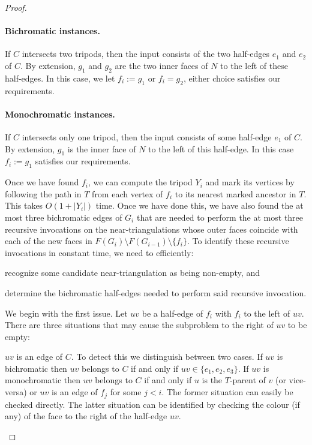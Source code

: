 \documentclass{patmorin}
\begin{document}
\begin{proof}
\paragraph{Bichromatic instances.}
If $C$ intersects two tripods, then the input consists of the two half-edges $e_1$ and $e_2$ of $C$. By extension, $g_1$ and $g_2$ are the two inner faces of $N$ to the left of these half-edges.  In this case, we let $f_i:=g_1$ or $f_i=g_2$, either choice satisfies our requirements.

\paragraph{Monochromatic instances.}
If $C$ intersects only one tripod, then the input consists of some half-edge $e_1$ of $C$. By extension, $g_1$ is the inner face of $N$ to the left of this half-edge.  In this case $f_i:=g_1$ satisfies our requirements.

Once we have found $f_i$, we can compute the tripod $Y_i$ and mark its vertices by following the path in $T$ from each vertex of $f_i$ to its nearest marked ancestor in $T$.  This takes $O(1+|Y_i|)$ time.  Once we have done this, we have also found the at most three bichromatic edges of $G_i$ that are needed to perform the at most three recursive invocations on the near-triangulations whose outer faces coincide with each of the new faces in $F(G_i)\setminus F(G_{i-1})\setminus\{f_i\}$. To identify these recursive invocations in constant time, we need to efficiently:
\begin{compactenum}
 \item recognize some candidate near-triangulation as being non-empty, and
 \item determine the bichromatic half-edges needed to perform said recursive invocation.
\end{compactenum}



We begin with the first issue.  Let $uv$ be a half-edge of $f_i$ with $f_i$ to the left of $uv$. 
There are three situations that may cause the subproblem to the right of $uv$ to be empty:
\begin{compactenum}
 \item $uv$ is an edge of $C$.  To detect this we distinguish between two cases.  If $uv$ is bichromatic then $uv$ belongs to $C$ if and only if $uv\in\{e_1,e_2,e_3\}$. If $uv$ is monochromatic then $uv$ belongs to $C$ if and only if $u$ is the $T$-parent of $v$ (or vice-versa) or $uv$ is an edge of $f_j$ for some $j<i$. The former situation can easily be checked directly. The latter situation can be identified by checking the colour (if any) of the face to the right of the half-edge $uv$.
 

\end{compactenum}
\end{proof}
\end{document}

